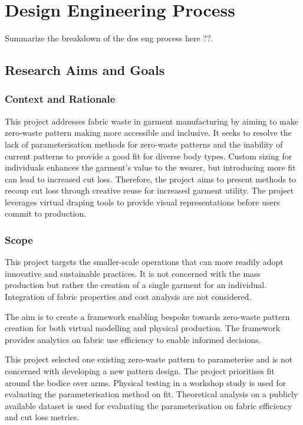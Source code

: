 \chapter{Design Engineering Process} 
Summarize the breakdown of the des eng process here ??.

\section{Research Aims and Goals}

\subsection{Context and Rationale}
This project addresses fabric waste in garment manufacturing by aiming to make zero-waste pattern making more accessible and inclusive. It seeks to resolve the lack of parameterisation methods for zero-waste patterns and the inability of current patterns to provide a good fit for diverse body types. Custom sizing for individuals enhances the garment's value to the wearer, but introducing more fit can lead to increased cut loss. Therefore, the project aims to present methods to recoup cut loss through creative reuse for increased garment utility. The project leverages virtual draping tools to provide visual representations before users commit to production.

\subsection{Scope}
This project targets the smaller-scale operations that can more readily adopt innovative and sustainable practices. It is not concerned with the mass production but rather the creation of a single garment for an individual. Integration of fabric properties and cost analysis are not considered. 

The aim is to create a framework enabling bespoke towards zero-waste pattern creation for both virtual modelling and physical production. The framework provides analytics on fabric use efficiency to enable informed decisions.  

This project selected one existing zero-waste pattern to parameterise and is not concerned with developing a new pattern design. The project prioritises fit around the bodice over arms. Physical testing in a workshop study is used for evaluating the parameterisation method on fit. Theoretical analysis on a publicly available dataset is used for evaluating the parameterisation on fabric efficiency and cut loss metrics.
 
